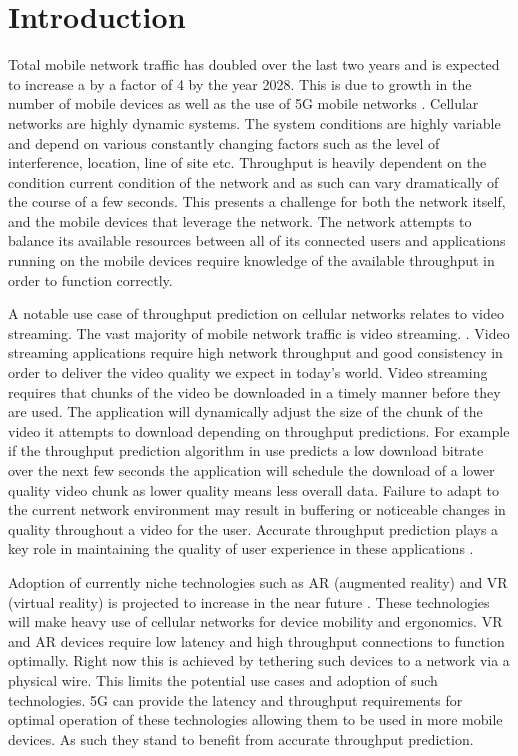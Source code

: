 \chapter{Introduction}
Total mobile network traffic has doubled over the last two years and is expected to increase a by a factor of 4 by the year 2028. This is due to growth in the number of mobile devices as well as the use of 5G mobile networks \cite{Eri22}. Cellular networks are highly dynamic systems. The system conditions are highly variable and depend on various constantly changing factors such as the level of interference, location, line of site etc. Throughput is heavily dependent on the condition current condition of the network and as such can vary dramatically of the course of a few seconds. This presents a challenge for both the network itself, and the mobile devices that leverage the network. The network attempts to balance its available resources between all of its connected users and applications running on the mobile devices require knowledge of the available throughput in order to function correctly. \cite{SOMETHING} 

A notable use case of throughput prediction on cellular networks relates to video streaming. The vast majority of mobile network traffic is video streaming. \cite{Eri22}. Video streaming applications require high network throughput and good consistency in order to deliver the video quality we expect in today's world. Video streaming requires that chunks of the video be downloaded in a timely manner before they are used. The application will dynamically adjust the size of the chunk of the video it attempts to download depending on throughput predictions. For example if the throughput prediction algorithm in use predicts a low download bitrate over the next few seconds the application will schedule the download of a lower quality video chunk as lower quality means less overall data. Failure to adapt to the current network environment may result in buffering or noticeable changes in quality throughout a video for the user. Accurate throughput prediction plays a key role in maintaining the quality of user experience in these applications \cite{THE PHD}. 

Adoption of currently niche technologies such as AR (augmented reality) and VR (virtual reality) is projected to increase in the near future \cite{Sta22}. These technologies will make heavy use of cellular networks for device mobility and ergonomics. VR and AR devices require low latency and high throughput connections to function optimally. Right now this is achieved by tethering such devices to a network via a physical wire. This limits the potential use cases and adoption of such technologies. 5G can provide the latency and throughput requirements for optimal operation of these technologies allowing them to be used in more mobile devices. As such they stand to benefit from accurate throughput prediction.

